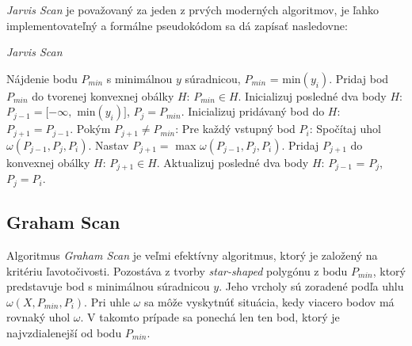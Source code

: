 \documentclass[11pt]{article}
\begin{document}
\textit{Jarvis Scan} je považovaný za jeden z prvých moderných algoritmov, je ľahko implementovateľný a formálne pseudokódom sa dá zapísať nasledovne:
\begin{algorithm}
    \caption {\textit{Jarvis Scan}}
    \begin{algorithmic}[1]
        \State Nájdenie bodu $P_{min}$ s minimálnou $y$ súradnicou, $P_{min}$ = min$(y_i)$.
        \State Pridaj bod $P_{min}$ do tvorenej konvexnej obálky $H$: $P_{min} \in H$.
        \State Inicializuj posledné dva body $H$: $P_{j-1} = [-\infty,$ min$(y_i)]$, $P_j = P_{min}$.
        \State Inicializuj pridávaný bod do $H$: $P_{j+1} = P_{j-1}$.
        \State Pokým $P_{j+1} \neq P_{min}$:
        \State \indent Pre každý vstupný bod $P_i$:
        \State \indent \indent Spočítaj uhol $\omega(P_{j-1}, P_j, P_i)$.
        \State \indent Nastav $P_{j+1} =$ max $\omega(P_{j-1}, P_j, P_i)$.
        \State \indent Pridaj $P_{j+1}$ do konvexnej obálky $H$: $P_{j+1} \in H$.
        \State \indent Aktualizuj posledné dva body $H$: $P_{j-1}$ = $P_j$, $P_j = P_i$.
    \end{algorithmic}
\end{algorithm}
\newpage
\subsection{Graham Scan} \label{gs}
Algoritmus \textit{Graham Scan} je veľmi efektívny algoritmus, ktorý je založený na kritériu ľavotočivosti. Pozostáva z tvorby \textit{star-shaped} polygónu z bodu $P_{min}$, ktorý predstavuje bod s minimálnou \linebreak súradnicou $y$. Jeho vrcholy sú zoradené podľa uhlu $\omega(X, P_{min}, P_i)$. Pri uhle $\omega$ sa môže vyskytnúť situácia, kedy viacero bodov má rovnaký uhol $\omega$. V takomto prípade sa ponechá len ten bod, ktorý je najvzdialenejší od bodu $P_{min}$.
\end{document}
